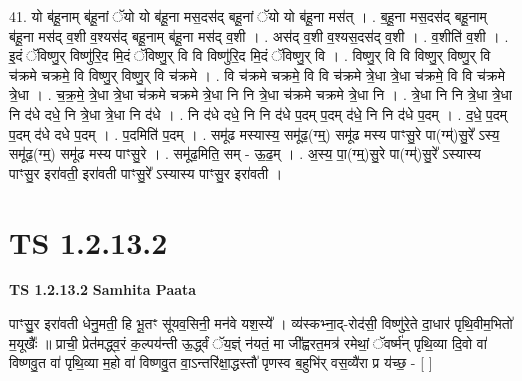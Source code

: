 \documentclass[17pt]{extarticle}
\begin{document}
41. यो ब॑हू॒नाम् ब॑हू॒नां ॅयो यो ब॑हू॒ना मस॒दस॑द् बहू॒नां ॅयो यो ब॑हू॒ना मस॑त् । . ब॒हू॒ना मस॒दस॑द् बहू॒नाम् ब॑हू॒ना मस॑द् व॒शी व॒श्यस॑द् बहू॒नाम् ब॑हू॒ना मस॑द् व॒शी । . अस॑द् व॒शी व॒श्यस॒दस॑द् व॒शी । . व॒शीति॑ व॒शी । . इ॒दं ॅविष्णु॒र् विष्णु॑रि॒द मि॒दं ॅविष्णु॒र् वि वि विष्णु॑रि॒द मि॒दं ॅविष्णु॒र् वि । . विष्णु॒र् वि वि विष्णु॒र् विष्णु॒र् वि च॑क्रमे चक्रमे॒ वि विष्णु॒र् विष्णु॒र् वि च॑क्रमे । . वि च॑क्रमे चक्रमे॒ वि वि च॑क्रमे त्रे॒धा त्रे॒धा च॑क्रमे॒ वि वि च॑क्रमे त्रे॒धा । . च॒क्र॒मे॒ त्रे॒धा त्रे॒धा च॑क्रमे चक्रमे त्रे॒धा नि नि त्रे॒धा च॑क्रमे चक्रमे त्रे॒धा नि । . त्रे॒धा नि नि त्रे॒धा त्रे॒धा नि द॑धे दधे॒ नि त्रे॒धा त्रे॒धा नि द॑धे । . नि द॑धे दधे॒ नि नि द॑धे प॒दम् प॒दम् द॑धे॒ नि नि द॑धे प॒दम् । . द॒धे॒ प॒दम् प॒दम् द॑धे दधे प॒दम् । . प॒दमिति॑ प॒दम् । . समू॑ढ मस्यास्य॒ समू॑ढ॒(ग्म्॒) समू॑ढ मस्य पाꣳसु॒रे पा(ग्म्॑)सु॒रे᳚ ऽस्य॒ समू॑ढ॒(ग्म्॒) समू॑ढ मस्य पाꣳसु॒रे । . समू॑ढ॒मिति॒ सम् - ऊ॒ढ॒म् । . अ॒स्य॒ पा॒(ग्म्॒)सु॒रे पा(ग्म्॑)सु॒रे᳚ ऽस्यास्य पाꣳसु॒र इरा॑वती॒ इरा॑वती पाꣳसु॒रे᳚ ऽस्यास्य पाꣳसु॒र इरा॑वती । \newline
\pagebreak
{}

\section{ TS 1.2.13.2 }

\textbf{TS 1.2.13.2 } \newline
\textbf{Samhita Paata} \newline

पाꣳसु॒॒र इरा॑वती धेनु॒मती॒ हि भू॒तꣳ सू॑यव॒सिनी॒ मन॑वे यश॒स्ये᳚ । व्य॑स्कभ्ना॒द्-रोद॑सी॒ विष्णु॑रे॒ते दा॒धार॑ पृथि॒वीम॒भितो॑ म॒यूखैः᳚ ॥ प्राची॒ प्रेत॑मद्ध्व॒रं क॒ल्पय॑न्ती ऊ॒र्द्ध्वं ॅय॒ज्ञ्ं न॑यतं॒ मा जी᳚ह्वरत॒मत्र॑ रमेथां॒ ॅवर्ष्म॑न् पृथि॒व्या दि॒वो वा॑ विष्णवु॒त वा॑ पृथि॒व्या म॒हो वा॑ विष्णवु॒त वा॒ऽन्तरि॑क्षा॒द्धस्तौ॑ पृणस्व ब॒हुभि॑र् वस॒व्यै॑रा प्र य॑च्छ॒ - [ ] \newline
\end{document}
